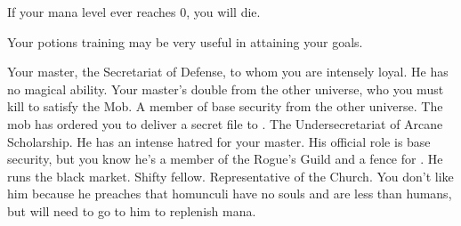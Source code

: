 \documentclass[char]{guildcamp3}
\begin{document}
\begin{itemz}[Notes]
	\item If your mana level ever reaches 0, you will die.
	\item Your potions training may be very useful in attaining your goals.
\end{itemz}


\begin{contacts}
	\contact{\cNobleOne{}} Your master, the Secretariat of Defense, to whom you are intensely loyal. He has no magical ability.
	\contact{\cPoliOne{}} Your master's double from the other universe, who you must kill to satisfy the Mob.
	\contact{\cSpecOpTwo{}} A member of base security from the other universe. The mob has ordered you to deliver a secret file to \cSpecOpTwo{\them}. 
	\contact{\cNobleTwo{}} The Undersecretariat of Arcane Scholarship. He has an intense hatred for your master.
	\contact{\cRogueTwo{}} His official role is base security, but you know he's a member of the Rogue's Guild and a fence for \bMagicMob{}. He runs the black market. Shifty fellow.
	\contact{\cPaladin{}} Representative of the Church. You don't like him because he preaches that homunculi have no souls and are less than humans, but will need to go to him to replenish mana.
\end{contacts}
\end{document}
